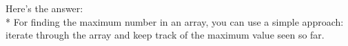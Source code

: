 \documentclass[preview]{standalone}
\begin{document}
Here's the answer:\\* For finding the maximum number in an array, you can use a simple approach: iterate through the array and keep track of the maximum value seen so far.\\
\end{document}
